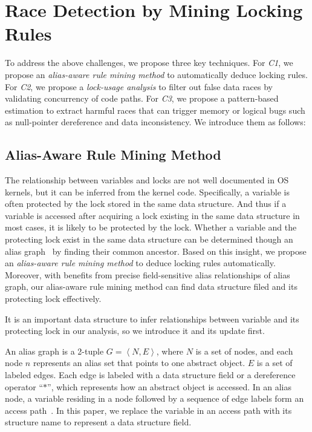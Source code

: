 \section{Race Detection by Mining Locking Rules}
\label{sec_technique}
To address the above challenges, we propose three key techniques. For {\em C1}, 
we propose an {\em alias-aware rule mining method} to automatically deduce 
locking rules. For {\em C2}, we propose a {\em lock-usage analysis} to filter 
out false data races by validating concurrency of code paths. For {\em C3}, we 
propose a pattern-based estimation to extract harmful races that can trigger 
memory or logical bugs such as null-pointer dereference and data inconsistency. 
We introduce them as follows:

\subsection{Alias-Aware Rule Mining Method}
\label{subsec_rule_mining}
The relationship between variables and locks are not well documented in OS 
kernels, but it can be inferred from the kernel code. Specifically, a variable 
is often protected by the lock stored in the same data structure. And thus if a 
variable is accessed after acquiring a lock existing in the same data structure 
in most cases, it is likely to be protected by the lock. Whether a variable and 
the protecting lock exist in the same data structure can be determined though 
an alias graph~\cite{Li:ASPLOS22, Kastrinis:CC18} by finding their common 
ancestor. Based on this insight, we propose an {\em alias-aware rule mining 
method} to deduce locking rules automatically. Moreover, with benefits from 
precise field-sensitive alias relationships of alias graph, our alias-aware 
rule mining method can find data structure filed and its protecting lock 
effectively.

 It is an important data structure to infer relationships 
between variable and its protecting lock in our analysis, so we introduce it 
and its update first. 

An alias graph is a 2-tuple $\mathit{G = \left<N, E\right>}$, where 
$\mathit{N}$ is a set of nodes, and each node $\mathit{n}$ represents an alias 
set that points to one abstract object. $\mathit{E}$ is a set of labeled edges. 
Each edge is labeled with a data structure field or a dereference operator 
``$\mathit{*}$'', which represents how an abstract object is accessed. In an 
alias node, a variable residing in a node followed by a sequence of edge
labels form an access path~\cite{Kastrinis:CC18, Cheng:PLDI00}. In this paper, 
we replace the variable in an access path with its structure name to represent 
a data structure field.


